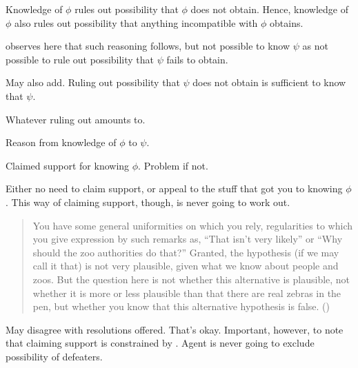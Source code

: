 \begin{note}
  Knowledge of \(\phi\) rules out possibility that \(\phi\) does not obtain.
  Hence, knowledge of \(\phi\) also rules out possibility that anything incompatible with \(\phi\) obtains.

  \citeauthor{Dretske:1970to} observes here that such reasoning follows, but not possible to know \(\psi\) as not possible to rule out possibility that \(\psi\) fails to obtain.

  May also add.
  Ruling out possibility that \(\psi\) does not obtain is sufficient to know that \(\psi\).

  Whatever ruling out amounts to.

  Reason from knowledge of \(\phi\) to \(\psi\).

  Claimed support for knowing \(\phi\).
  Problem if not.

  Either no need to claim support, or appeal to the stuff that got you to knowing \(\phi\).
  This way of claiming support, though, is never going to work out.

  \begin{quote}
    You have some general uniformities on which you rely, regularities to which you give expression by such remarks as, ``That isn't very likely'' or ``Why should the zoo authorities do that?''
    Granted, the hypothesis (if we may call it that) is not very plausible, given what we know about people and zoos.
    But the question here is not whether this alternative is plausible, not whether it is more or less plausible than that there are real zebras in the pen, but whether you know that this alternative hypothesis is false.\nolinebreak
    \mbox{}\hfill\mbox{(\citeyear[1016]{Dretske:1970to})}
  \end{quote}
\end{note}

\begin{note}
  \color{red}
  May disagree with resolutions offered.
  That's okay.
  Important, however, to note that claiming support is constrained by \nfcs{}.
  Agent is never going to exclude possibility of defeaters.
\end{note}



